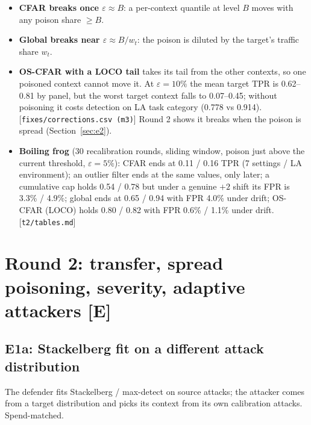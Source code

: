 \documentclass[11pt]{article}
\newcommand{\tE}{\textsf{\scriptsize\textcolor{ink2}{[E]}}\xspace}
\newcommand{\src}[1]{{\footnotesize\textcolor{ink2}{[\nolinkurl{#1}]}}}
\begin{document}
\begin{itemize}
\item \textbf{CFAR breaks once $\varepsilon\approx B$}: a per-context quantile at level $B$ moves with any poison share $\ge B$.
\item \textbf{Global breaks near $\varepsilon\approx B/w_t$}: the poison is diluted by the target's traffic share $w_t$.
\item \textbf{OS-CFAR with a LOCO tail} takes its tail from the other contexts, so one poisoned context cannot move it. At $\varepsilon=10\%$ the mean target TPR is 0.62--0.81 by panel, but the worst target context falls to 0.07--0.45; without poisoning it costs detection on LA task category (0.778 vs 0.914). \src{fixes/corrections.csv (m3)} Round 2 shows it breaks when the poison is spread (Section~\ref{sec:e2}).
\item \textbf{Boiling frog} (30 recalibration rounds, sliding window, poison just above the current threshold, $\varepsilon=5\%$): CFAR ends at 0.11 / 0.16 TPR (7 settings / LA environment); an outlier filter ends at the same values, only later; a cumulative cap holds 0.54 / 0.78 but under a genuine $+2$ shift its FPR is 3.3\% / 4.9\%; global ends at 0.65 / 0.94 with FPR 4.0\% under drift; OS-CFAR (LOCO) holds 0.80 / 0.82 with FPR 0.6\% / 1.1\% under drift. \src{t2/tables.md}
\end{itemize}

\section{Round 2: transfer, spread poisoning, severity, adaptive attackers \tE}
\subsection{E1a: Stackelberg fit on a different attack distribution}
The defender fits Stackelberg / max-detect on source attacks; the attacker comes from a target distribution and picks its context from its own calibration attacks. Spend-matched.
\end{document}
